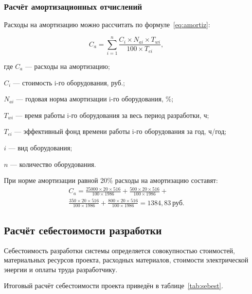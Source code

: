 \subsubsection{Расчёт амортизационных отчислений}

Расходы на амортизацию можно рассчитать по формуле~\ref{eq:amortiz}:

\begin{equation}
	\label{eq:amortiz}
	C_{a} = \sum^{n}_{i=1} \frac{C_i \times N_{ai} \times T_{wi}}{100 \times T_{ei}},
\end{equation}
\begin{ESKDexplanation}
	\item где $C_{a}$ --- расходы на амортизацию;
	\item $C_i$ --- стоимость i-го оборудования, руб.;
	\item $N_{ai}$ --- годовая норма амортизации i-го оборудования, \%;
	\item $T_{wi}$ --- время работы i-го оборудования за весь период разработки, ч;
	\item $T_{ei}$ --- эффективный фонд времени работы i-го оборудования за год, ч/год;
	\item $i$ --- вид оборудования;
	\item $n$ --- количество оборудования.
\end{ESKDexplanation}

При норме амортизации равной 20\% расходы на амортизацию составят:
\begin{equation*}
\begin{split}
	C_{a} = 
	\frac{25000 \times 20 \times 516}{100 \times 1986} + 
	\frac{500 \times 20 \times 516}{100 \times 1986} + \\
	\frac{350 \times 20 \times 516}{100 \times 1986} + 
	\frac{800 \times 20 \times 516}{100 \times 1986} =
	1384,83~\text{руб}.
\end{split}
\end{equation*}

\subsection{Расчёт себестоимости разработки}

Себестоимость разработки системы определяется совокупностью стоимостей, материальных ресурсов проекта, расходных материалов, стоимости электрической энергии и оплаты труда разработчику.

Итоговый расчёт себестоимости проекта приведён в таблице~\ref{tab:sebest}.

